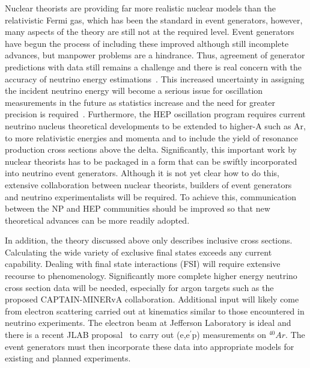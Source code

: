 Nuclear theorists are providing far more realistic nuclear models than
the relativistic Fermi gas, which has been the standard in event
generators, however, many aspects of the theory are still not at the
required level.  Event generators have begun the process of including
these improved although still incomplete advances, but manpower
problems are a hindrance. Thus, agreement of generator predictions
with data still remains a challenge and there is real concern with the
accuracy of neutrino energy
estimations~\cite{Martini:2011wp,Lalakulich:2012hs,Shneor:2007tu}.
This increased uncertainty in assigning the incident neutrino energy
will become a serious issue for oscillation measurements in the future
as statistics increase and the need for greater precision is
required~\cite{1412.4294}.  Furthermore, the HEP oscillation program
requires current neutrino nucleus theoretical developments to be
extended to higher-A such as Ar, to more relativistic energies and
momenta and to include the yield of resonance production cross
sections above the delta.  Significantly, this important work by
nuclear theorists has to be packaged in a form that can be swiftly
incorporated into neutrino event generators. Although it is not yet
clear how to do this, extensive collaboration between nuclear
theorists, builders of event generators and neutrino
experimentalists will be required. To achieve this, communication
between the NP and HEP communities should be improved so that new
theoretical advances can be more readily adopted.

In addition, the theory discussed above only describes inclusive cross
sections. Calculating the wide variety of exclusive final states
exceeds any current capability. Dealing with final state interactions
(FSI) will require extensive recourse to phenomenology.  Significantly
more complete higher energy neutrino cross section data will be
needed, especially for argon targets such as the proposed
CAPTAIN-MINERvA collaboration.  Additional input will likely come from
electron scattering carried out at kinematics similar to those
encountered in neutrino experiments. The electron beam at Jefferson
Laboratory is ideal and there is a recent JLAB
proposal~\cite{Benhar:2014nca} to carry out (e,e$^\prime$p)
measurements on $^{40}Ar$. The event generators must then incorporate
these data into appropriate models for existing and planned
experiments.
  


